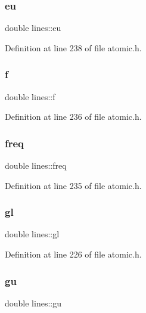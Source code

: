 \subsubsection{\texorpdfstring{eu}{eu}}
{\footnotesize\ttfamily double lines\+::eu}



Definition at line 238 of file atomic.\+h.

\mbox{\label{structlines_adda9b685ebb8bc0dd55faea92c24f3ca}} 
\subsubsection{\texorpdfstring{f}{f}}
{\footnotesize\ttfamily double lines\+::f}



Definition at line 236 of file atomic.\+h.

\mbox{\label{structlines_a4d74840df54d02617c21c66b2498a81c}} 
\subsubsection{\texorpdfstring{freq}{freq}}
{\footnotesize\ttfamily double lines\+::freq}



Definition at line 235 of file atomic.\+h.

\mbox{\label{structlines_a5165d0546a6f5fa57612a4476d2b5ab9}} 
\subsubsection{\texorpdfstring{gl}{gl}}
{\footnotesize\ttfamily double lines\+::gl}



Definition at line 226 of file atomic.\+h.

\mbox{\label{structlines_a0e2eb51cd04b7d4bbc112e63d1744a9f}} 
\subsubsection{\texorpdfstring{gu}{gu}}
{\footnotesize\ttfamily double lines\+::gu}




